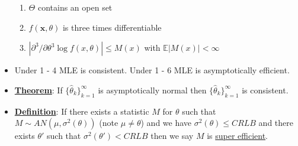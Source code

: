 \documentclass{article}
\newcommand{\E}{{\mathbb{E}}}
\newcommand{\x}{{\textbf{x}}}
\begin{document}
\begin{itemize}
\begin{enumerate}
\item $\Theta$ contains an open set
\item $f(\x,\theta)$ is three times differentiable
\item $|\partial^3/\partial\theta^3\log f(x,\theta)|\leq M(x)$ with $\E|M(x)|<\infty$
\end{enumerate}
\item Under 1 - 4 MLE is consistent. Under 1 - 6 MLE is asymptotically efficient. 
\item \underline{\textbf{Theorem}}: If $\{\hat{\theta}_k\}_{k=1}^{\infty}$ is asymptotically normal then $\{\hat{\theta}_k\}_{k=1}^{\infty}$ is consistent. 
\item \underline{\textbf{Definition}}: If there exists a statistic $M$ for $\theta$ such that $M\sim AN(\mu, \sigma^2(\theta))$ (note $\mu\neq\theta$) and we have $\sigma^2(\theta)\leq CRLB$ and there exists $\theta'$ such that $\sigma^2(\theta')<CRLB$ then we say $M$ is \underline{super efficient}. 
\end{itemize}
\end{document}
